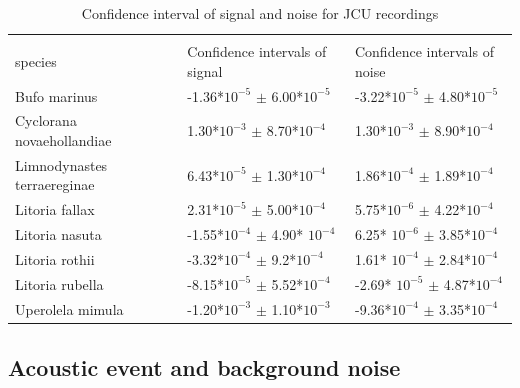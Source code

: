 \begin{table}[htb!]
\centering
\caption[Confidence interval for JCU recordings]{Confidence interval of signal and noise for JCU recordings}
\label{tab:CI_JCU}
\begin{tabular}{lll}
\hline\hline
   \backslashbox{Frog \\ species}{Parameters}                          & Confidence intervals of signal & Confidence intervals of noise \\ \hline
Bufo marinus                &   -1.36*$10^{-5}$ $\pm$ 6.00*$10^{-5}$                             &                              -3.22*$10^{-5}$ $\pm$ 4.80*$10^{-5}$ \\ \hline
Cyclorana novaehollandiae   &    1.30*$10^{-3}$ $\pm$ 8.70*$10^{-4}$                            &                              1.30*$10^{-3}$ $\pm$ 8.90*$10^{-4}$ \\ \hline
Limnodynastes terraereginae &       6.43*$10^{-5}$ $\pm$  1.30*$10^{-4}$                         &                              1.86*$10^{-4}$ $\pm$ 1.89*$10^{-4}$ \\ \hline
Litoria fallax              &  2.31*$10^{-5}$ $\pm$ 5.00*$10^{-4}$                              &                              5.75*$10^{-6}$ $\pm$ 4.22*$10^{-4}$ \\ \hline
Litoria nasuta              &                  -1.55*$10^{-4}$ $\pm$ 4.90* $10^{-4}$              &                              6.25* $10^{-6}$ $\pm$ 3.85*$10^{-4}$ \\ \hline
Litoria rothii              &              -3.32*$10^{-4}$ $\pm$ 9.2*$10^{-4}$                  &                              1.61* $10^{-4}$ $\pm$ 2.84*$10^{-4}$ \\ \hline
Litoria rubella             &      -8.15*$10^{-5}$ $\pm$ 5.52*$10^{-4}$                          &                              -2.69* $10^{-5}$ $\pm$ 4.87*$10^{-4}$ \\ \hline
Uperolela mimula            &             -1.20*$10^{-3}$  $\pm$ 1.10*$10^{-3}$                   &                              -9.36*$10^{-4}$ $\pm$ 3.35*$10^{-4}$ \\ \hline\hline
\end{tabular}
\end{table}




\subsection{Acoustic event and background noise}



